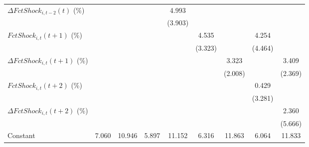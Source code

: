 {\begin{tabular}{l*{8}{c}}
\addlinespace
$ \Delta FctShock_{i,t-2}(t)$ (\%)&                     &                     &                     &       4.993         &                     &                     &                     &                     \\
                    &                     &                     &                     &     (3.903)         &                     &                     &                     &                     \\
\addlinespace
$ FctShock_{i,t}(t+1)$ (\%)&                     &                     &                     &                     &       4.535         &                     &       4.254         &                     \\
                    &                     &                     &                     &                     &     (3.323)         &                     &     (4.464)         &                     \\
\addlinespace
$ \Delta FctShock_{i,t}(t+1)$ (\%)&                     &                     &                     &                     &                     &       3.323         &                     &       3.409         \\
                    &                     &                     &                     &                     &                     &     (2.008)         &                     &     (2.369)         \\
\addlinespace
$ FctShock_{i,t}(t+2)$ (\%)&                     &                     &                     &                     &                     &                     &       0.429         &                     \\
                    &                     &                     &                     &                     &                     &                     &     (3.281)         &                     \\
\addlinespace
$ \Delta FctShock_{i,t}(t+2)$ (\%)&                     &                     &                     &                     &                     &                     &                     &       2.360         \\
                    &                     &                     &                     &                     &                     &                     &                     &     (5.666)         \\
\addlinespace
Constant            &       7.060\sym{**} &      10.946\sym{***}&       5.897         &      11.152\sym{***}&       6.316         &      11.863\sym{***}&       6.064         &      11.833\sym{***}\\

\end{tabular}}
